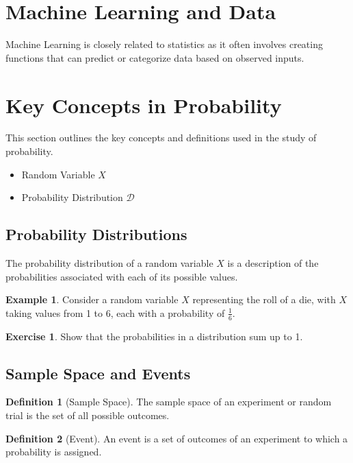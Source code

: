 \documentclass[12pt,openany]{book}
\theoremstyle{definition}
\newtheorem{definition}{Definition}[chapter]
\newtheorem{exercise}{Exercise}[chapter]
\newtheorem{example}{Example}[chapter]
\begin{document}
	\section{Machine Learning and Data}
	Machine Learning is closely related to statistics as it often involves creating functions that can predict or categorize data based on observed inputs.
	
	\section{Key Concepts in Probability}
	This section outlines the key concepts and definitions used in the study of probability.
	
	\begin{itemize}
		\item Random Variable $X$
		\item Probability Distribution $\mathcal{D}$
	\end{itemize}
	
	\subsection{Probability Distributions}
	The probability distribution of a random variable $X$ is a description of the probabilities associated with each of its possible values.
	
	\begin{example}
		Consider a random variable $X$ representing the roll of a die, with $X$ taking values from 1 to 6, each with a probability of $\frac{1}{6}$.
	\end{example}
	
	\begin{exercise}
		Show that the probabilities in a distribution sum up to 1.
	\end{exercise}
	
	\subsection{Sample Space and Events}
	\begin{definition}[Sample Space]
		The sample space of an experiment or random trial is the set of all possible outcomes.
	\end{definition}
	
	\begin{definition}[Event]
		An event is a set of outcomes of an experiment to which a probability is assigned.
	\end{definition}
	
\end{document}
